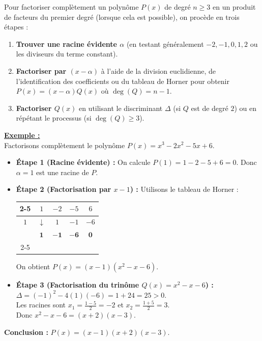 \documentclass[12pt,a4paper]{article}
\newcounter{exemple}
\newcommand{\exemple}{%
  \refstepcounter{exemple}%
  \textbf{\textcolor{green!60!black}{Exemple \theexemple :}} \ignorespaces
}
\begin{document}
Pour factoriser complètement un polynôme $P(x)$ de degré $n \geq 3$ en un produit de facteurs du premier degré (lorsque cela est possible), on procède en trois étapes :
\begin{enumerate}
    \item \textbf{Trouver une racine évidente $\alpha$} (en testant généralement $-2, -1, 0, 1, 2$ ou les diviseurs du terme constant).
    \item \textbf{Factoriser par $(x - \alpha)$} à l'aide de la division euclidienne, de l'identification des coefficients ou du tableau de Horner pour obtenir $P(x) = (x - \alpha)Q(x)$ où $\deg(Q) = n - 1$.
    \item \textbf{Factoriser $Q(x)$} en utilisant le discriminant $\Delta$ (si $Q$ est de degré $2$) ou en répétant le processus (si $\deg(Q) \geq 3$).
\end{enumerate}

\medskip
\underline{\exemple} \\
Factorisons complètement le polynôme $P(x) = x^3 - 2x^2 - 5x + 6$.
\begin{itemize}[label=]
    \item \textbf{Étape 1 (Racine évidente) :} On calcule $P(1) = 1 - 2 - 5 + 6 = 0$. Donc $\alpha = 1$ est une racine de $P$.
    \item \textbf{Étape 2 (Factorisation par $x - 1$) :} Utilisons le tableau de Horner :
    \begin{center}
    \renewcommand{\arraystretch}{1.4}
    \begin{tabular}{c|c|c|c|c|}
    \cline{2-5}
     & $1$ & $-2$ & $-5$ & $6$ \\
    \hline
    $1$ & $\downarrow$ & $1$ & $-1$ & $-6$ \\
    \hline
     & $\mathbf{1}$ & $\mathbf{-1}$ & $\mathbf{-6}$ & $\mathbf{0}$ \\
    \cline{2-5}
    \end{tabular}
    \end{center}
    On obtient $P(x) = (x - 1)(x^2 - x - 6)$.
    \item \textbf{Étape 3 (Factorisation du trinôme $Q(x) = x^2 - x - 6$) :} \\
    $\Delta = (-1)^2 - 4(1)(-6) = 1 + 24 = 25 > 0$. \\
    Les racines sont $x_1 = \frac{1 - 5}{2} = -2$ et $x_2 = \frac{1 + 5}{2} = 3$. \\
    Donc $x^2 - x - 6 = (x + 2)(x - 3)$.
\end{itemize}
\textbf{Conclusion :} $P(x) = (x - 1)(x + 2)(x - 3)$.
\end{document}
